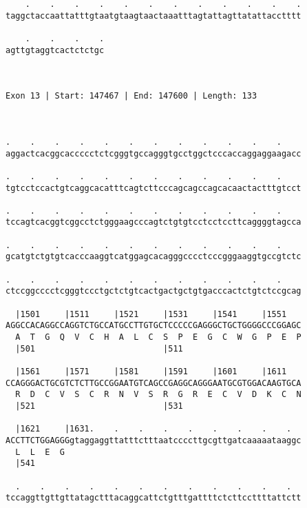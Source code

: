\documentclass{article}
\begin{document}
\begin{Verbatim}
    .    .    .    .    .    .    .    .    .    .    .    .
taggctaccaattatttgtaatgtaagtaactaaatttagtattagttatattacctttt
                                                            
    .    .    .    .
agttgtaggtcactctctgc
                    
                    
 
Exon 13 | Start: 147467 | End: 147600 | Length: 133



.    .    .    .    .    .    .    .    .    .    .    .    
aggactcacggcaccccctctcgggtgccagggtgcctggctcccaccaggaggaagacc
                                                            
.    .    .    .    .    .    .    .    .    .    .    .    
tgtcctccactgtcaggcacatttcagtcttcccagcagccagcacaactactttgtcct
                                                            
.    .    .    .    .    .    .    .    .    .    .    .    
tccagtcacggtcggcctctgggaagcccagtctgtgtcctcctccttcaggggtagcca
                                                            
.    .    .    .    .    .    .    .    .    .    .    .    
gcatgtctgtgtcacccaaggtcatggagcacagggcccctcccgggaaggtgccgtctc
                                                            
.    .    .    .    .    .    .    .    .    .    .    .    
ctccggcccctcgggtccctgctctgtcactgactgctgtgacccactctgtctccgcag
                                                            
  |1501     |1511     |1521     |1531     |1541     |1551   
AGGCCACAGGCCAGGTCTGCCATGCCTTGTGCTCCCCCGAGGGCTGCTGGGGCCCGGAGC
  A  T  G  Q  V  C  H  A  L  C  S  P  E  G  C  W  G  P  E  P
  |501                          |511                        
  
  |1561     |1571     |1581     |1591     |1601     |1611   
CCAGGGACTGCGTCTCTTGCCGGAATGTCAGCCGAGGCAGGGAATGCGTGGACAAGTGCA
  R  D  C  V  S  C  R  N  V  S  R  G  R  E  C  V  D  K  C  N
  |521                          |531                        
  
  |1621     |1631.    .    .    .    .    .    .    .    .  
ACCTTCTGGAGGGgtaggaggttatttctttaatccccttgcgttgatcaaaaataaggc
  L  L  E  G                                                
  |541                                                      
  
  .    .    .    .    .    .    .    .    .    .    .    .  
tccaggttgttgttatagctttacaggcattctgtttgattttctcttccttttattctt
                                                            

\end{Verbatim}
\end{document}
